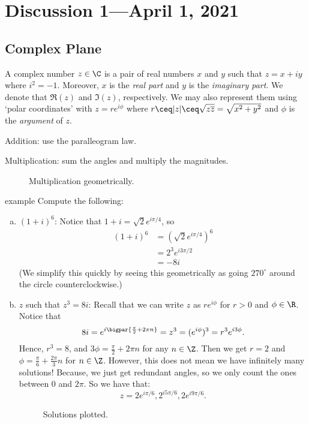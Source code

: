 \documentclass[class=article, crop=false]{standalone}
\begin{document}
\section{Discussion 1---April 1, 2021}

\subsection*{Complex Plane}

A complex number $z \in \C$ is a pair of real numbers $x$ and $y$ such that $z = x+iy$ where $i^2=-1$. Moreover, $x$ is the \emph{real part} and $y$ is the \emph{imaginary part}. We denote that $\Re(z)$ and $\Im(z)$, respectively. We may also represent them using `polar coordinates' with $z = r e^{i \phi}$ where $r \ceq |z| \ceq \sqrt{z \overline z} = \sqrt{x^2+y^2}$ and $\phi$ is the \emph{argument} of $z$.

Addition: use the paralleogram law.

Multiplication: sum the angles and multiply the magnitudes.
\begin{figure}[ht]
  \center
  \caption{Multiplication geometrically.}
\end{figure}


\begin{understandingcheck}{example}
  Compute the following:
    \begin{enumerate}[(a)]
      \item $(1+i)^6$: Notice that $1+i = \sqrt 2 e^{i\pi/4}$, so
        \begin{align*}
          (1+i)^6 &= (\sqrt 2 e^{i\pi/4})^6 \\
            &= 2^3 e^{i3\pi/2} \\
            &= -8i
        \end{align*}
      (We simplify this quickly by seeing this geometrically as going $270^\circ$ around the circle counterclockwise.)

      \item $z$ such that $z^3 = 8i$: Recall that we can write $z$ as $r e^{i\phi}$ for $r > 0$ and $\phi \in \R$. Notice that
        \[
          8i = e^{i \bigpar{\frac{\pi}{2} + 2\pi n}} = z^3 = (e^{i \phi})^3 = r^3 e^{i3 \phi}.
        \]
      Hence, $r^3 = 8$, and $3 \phi = \frac{\pi}{2} + 2\pi n$ for any $n \in \Z$. Then we get $r=2$ and $\phi = \frac{\pi}{6} + \frac{2 \pi }{3}n$ for $n \in \Z$. However, this does not mean we have infinitely many solutions! Because, we just get redundant angles, so we only count the ones between $0$ and $2\pi$. So we have that:
        \[
          z = 2e^{i\pi/6}, 2^{i5\pi/6},2e^{i9\pi/6}.
        \]
      \begin{figure}[ht]
        \center
        \caption{Solutions plotted.}
      \end{figure}

    \end{enumerate}
\end{understandingcheck}
\end{document}

